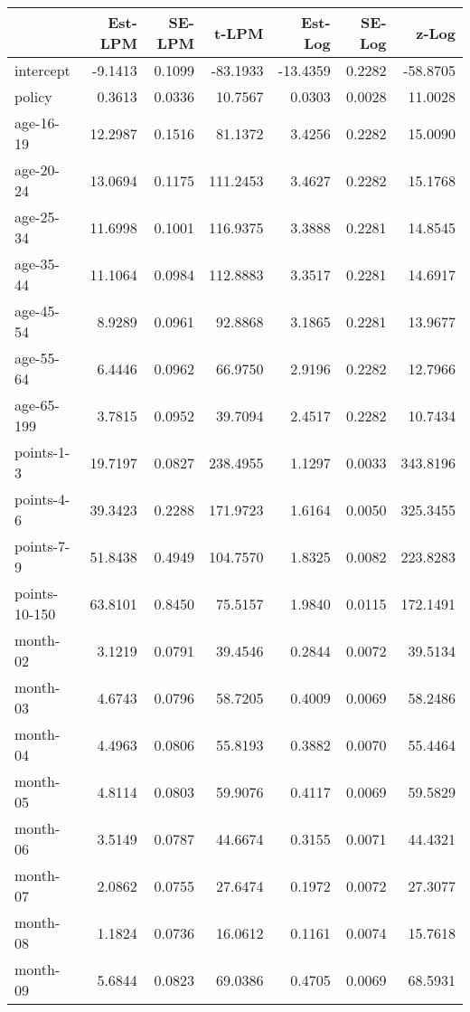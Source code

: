 \documentclass[10pt]{article}
\begin{document}
\begin{table}[ht]
\centering
\begin{tabular}{lrrrrrr}
  \hline
 & Est-LPM & SE-LPM & t-LPM & Est-Log & SE-Log & z-Log \\ 
  \hline
intercept & -9.1413 & 0.1099 & -83.1933 & -13.4359 & 0.2282 & -58.8705 \\ 
  policy & 0.3613 & 0.0336 & 10.7567 & 0.0303 & 0.0028 & 11.0028 \\ 
  age-16-19 & 12.2987 & 0.1516 & 81.1372 & 3.4256 & 0.2282 & 15.0090 \\ 
  age-20-24 & 13.0694 & 0.1175 & 111.2453 & 3.4627 & 0.2282 & 15.1768 \\ 
  age-25-34 & 11.6998 & 0.1001 & 116.9375 & 3.3888 & 0.2281 & 14.8545 \\ 
  age-35-44 & 11.1064 & 0.0984 & 112.8883 & 3.3517 & 0.2281 & 14.6917 \\ 
  age-45-54 & 8.9289 & 0.0961 & 92.8868 & 3.1865 & 0.2281 & 13.9677 \\ 
  age-55-64 & 6.4446 & 0.0962 & 66.9750 & 2.9196 & 0.2282 & 12.7966 \\ 
  age-65-199 & 3.7815 & 0.0952 & 39.7094 & 2.4517 & 0.2282 & 10.7434 \\ 
  points-1-3 & 19.7197 & 0.0827 & 238.4955 & 1.1297 & 0.0033 & 343.8196 \\ 
  points-4-6 & 39.3423 & 0.2288 & 171.9723 & 1.6164 & 0.0050 & 325.3455 \\ 
  points-7-9 & 51.8438 & 0.4949 & 104.7570 & 1.8325 & 0.0082 & 223.8283 \\ 
  points-10-150 & 63.8101 & 0.8450 & 75.5157 & 1.9840 & 0.0115 & 172.1491 \\ 
  month-02 & 3.1219 & 0.0791 & 39.4546 & 0.2844 & 0.0072 & 39.5134 \\ 
  month-03 & 4.6743 & 0.0796 & 58.7205 & 0.4009 & 0.0069 & 58.2486 \\ 
  month-04 & 4.4963 & 0.0806 & 55.8193 & 0.3882 & 0.0070 & 55.4464 \\ 
  month-05 & 4.8114 & 0.0803 & 59.9076 & 0.4117 & 0.0069 & 59.5829 \\ 
  month-06 & 3.5149 & 0.0787 & 44.6674 & 0.3155 & 0.0071 & 44.4321 \\ 
  month-07 & 2.0862 & 0.0755 & 27.6474 & 0.1972 & 0.0072 & 27.3077 \\ 
  month-08 & 1.1824 & 0.0736 & 16.0612 & 0.1161 & 0.0074 & 15.7618 \\ 
  month-09 & 5.6844 & 0.0823 & 69.0386 & 0.4705 & 0.0069 & 68.5931 \\ 

\end{tabular}
\end{table}
\end{document}
